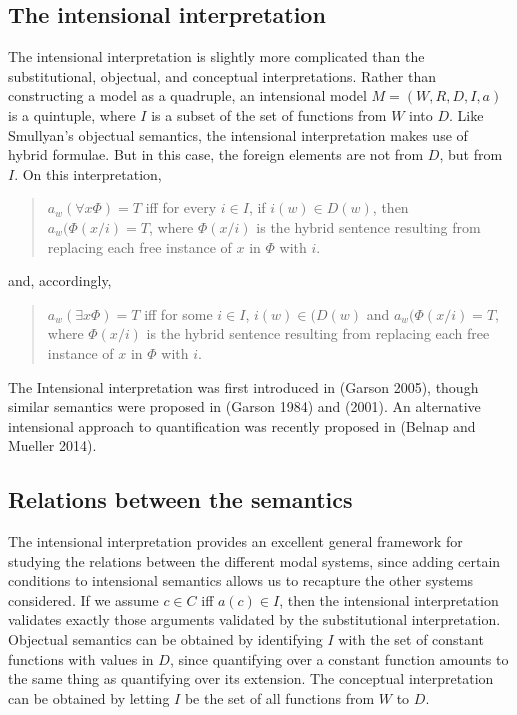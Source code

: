 \documentclass[]{article}
\begin{document}
\subsection{The intensional interpretation}
The intensional interpretation is slightly more complicated than the substitutional, objectual, and conceptual interpretations. Rather than constructing a model as a quadruple, an intensional model $M = (W, R, D, I, a)$ is a quintuple, where $I$ is a subset of the set of functions from $W$ into $D$. Like Smullyan's objectual semantics, the intensional interpretation makes use of hybrid formulae. But in this case, the foreign elements are not from $D$, but from $I$. On this interpretation, 
\begin{quote}
$a_{w} (\forall x \Phi) = T$ iff for every $i \in I$, if $i(w) \in D(w)$, then $a_{w}(\Phi(x/i) = T$, where $\Phi(x/i)$ is the hybrid sentence resulting from replacing each free instance of $x$ in $\Phi$ with $i$.
\end{quote}

and, accordingly, 

\begin{quote}
$a_{w} (\exists x \Phi) = T$ iff for some $i \in I$, $i(w) \in (D(w)$ and $a_{w} (\Phi(x/i) = T$, where $\Phi(x/i)$ is the hybrid sentence resulting from replacing each free instance of $x$ in $\Phi$ with $i$.
\end{quote}

The Intensional interpretation was first introduced in (Garson 2005), though similar semantics were proposed in (Garson 1984) and (2001). An alternative intensional approach to quantification was recently proposed in (Belnap and Mueller 2014).
\subsection{Relations between the semantics}
The intensional interpretation provides an excellent general framework for studying the relations between the different modal systems, since adding certain conditions to intensional semantics allows us to recapture the other systems considered. If we assume $c \in C$ iff $a(c) \in I$, then the intensional interpretation validates exactly those arguments validated by the substitutional interpretation. Objectual semantics can be obtained by identifying $I$ with the set of constant functions with values in $D$, since quantifying over a constant function amounts to the same thing as quantifying over its extension. The conceptual interpretation can be obtained by letting $I$ be the set of all functions from $W$ to $D$.
\end{document}
